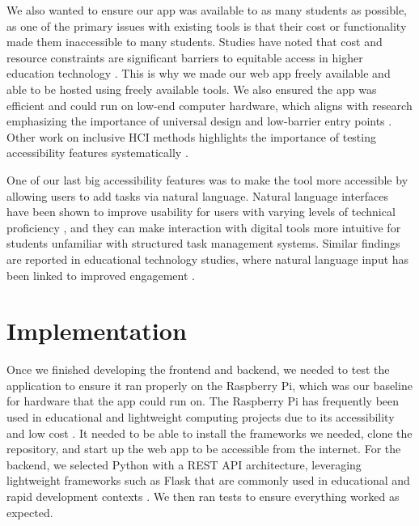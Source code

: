 \documentclass[11pt,oneside]{article}
\begin{document}
We also wanted to ensure our app was available to as many students as possible, as one of the primary issues with existing tools is that their cost or functionality made them inaccessible to many students. Studies have noted that cost and resource constraints are significant barriers to equitable access in higher education technology \citep{selwyn2021education}. This is why we made our web app freely available and able to be hosted using freely available tools. We also ensured the app was efficient and could run on low-end computer hardware, which aligns with research emphasizing the importance of universal design and low-barrier entry points \citep{rose2002teaching}. Other work on inclusive HCI methods highlights the importance of testing accessibility features systematically \citep{lazar2017research}.

One of our last big accessibility features was to make the tool more accessible by allowing users to add tasks via natural language.  Natural language interfaces have been shown to improve usability for users with varying levels of technical proficiency \citep{shneiderman2010designing}, and they can make interaction with digital tools more intuitive for students unfamiliar with structured task management systems. Similar findings are reported in educational technology studies, where natural language input has been linked to improved engagement \citep{junco2012relationship}.


\section{Implementation}

Once we finished developing the frontend and backend, we needed to test the application to ensure it ran properly on the Raspberry Pi, which was our baseline for hardware that the app could run on. The Raspberry Pi has frequently been used in educational and lightweight computing projects due to its accessibility and low cost \citep{richardson2014getting}. It needed to be able to install the frameworks we needed, clone the repository, and start up the web app to be accessible from the internet. For the backend, we selected Python with a REST API architecture, leveraging lightweight frameworks such as Flask that are commonly used in educational and rapid development contexts \citep{grinberg2018flask}. We then ran tests to ensure everything worked as expected.
\end{document}

